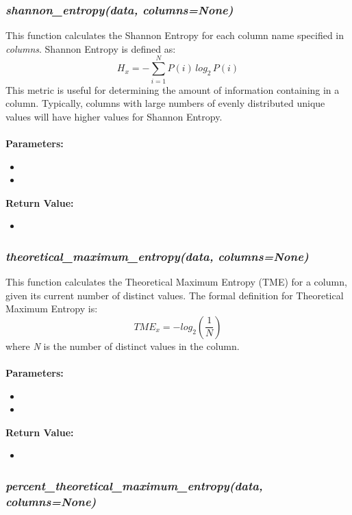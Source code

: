 \documentclass[titlepage, 11pt]{article}
\begin{document}
\subsubsection{\textit{shannon\_entropy(data, columns=None)}}
\label{entr}
This function calculates the Shannon Entropy for each column name specified in \textit{columns}. Shannon Entropy is defined as:
\begin{equation}
    H_x = -\sum_{i=1}^{N}P(i) \, log_2 \,P(i)
\end{equation}
This metric is useful for determining the amount of information containing in a column. Typically, columns with large numbers of evenly distributed unique values will have higher values for Shannon Entropy.
\\
\\
\textbf{Parameters:}
\begin{itemize}
    \item \docdata
    \item \doccols
\end{itemize}
\textbf{Return Value:}
\begin{itemize}
    \item {}
\end{itemize}

\subsubsection{\textit{theoretical\_maximum\_entropy(data, columns=None)}}
\label{tentr}
This function calculates the Theoretical Maximum Entropy (TME) for a column, given its current number of distinct values. The formal definition for Theoretical Maximum Entropy is:
\begin{equation}
    TME_x= -log_2(\frac{1}{N})
\end{equation}
where \textit{N} is the number of distinct values in the column. 
\\
\\
\textbf{Parameters:}
\begin{itemize}
    \item \docdata
    \item \doccols
\end{itemize}
\textbf{Return Value:}
\begin{itemize}
    \item {}
\end{itemize}

\subsubsection{\textit{percent\_theoretical\_maximum\_entropy(data, columns=None)}}
\end{document}
